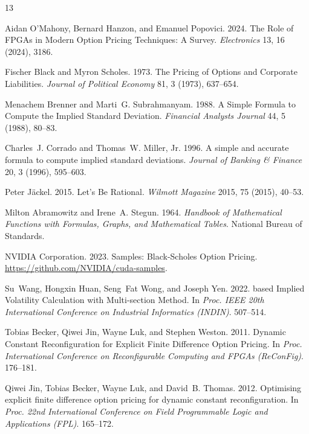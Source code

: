 \documentclass[sigconf,anonymous,review]{acmart}
\begin{document}
\begin{thebibliography}{13}

Aidan O'Mahony, Bernard Hanzon, and Emanuel Popovici. 2024.
\newblock The Role of {FPGAs} in Modern Option Pricing Techniques: A Survey.
\newblock \emph{Electronics} 13, 16 (2024), 3186.

Fischer Black and Myron Scholes. 1973.
\newblock The Pricing of Options and Corporate Liabilities.
\newblock \emph{Journal of Political Economy} 81, 3 (1973), 637--654.

Menachem Brenner and Marti~G. Subrahmanyam. 1988.
\newblock A Simple Formula to Compute the Implied Standard Deviation.
\newblock \emph{Financial Analysts Journal} 44, 5 (1988), 80--83.

Charles~J. Corrado and Thomas~W. Miller, Jr. 1996.
\newblock A simple and accurate formula to compute implied standard deviations.
\newblock \emph{Journal of Banking \& Finance} 20, 3 (1996), 595--603.

Peter J{\"a}ckel. 2015.
\newblock Let's Be Rational.
\newblock \emph{Wilmott Magazine} 2015, 75 (2015), 40--53.

Milton Abramowitz and Irene~A. Stegun. 1964.
\newblock \emph{Handbook of Mathematical Functions with Formulas, Graphs, and Mathematical Tables}.
\newblock National Bureau of Standards.

{NVIDIA Corporation}. 2023.
 Samples: {Black-Scholes} Option Pricing.
\newblock \url{https://github.com/NVIDIA/cuda-samples}.

Su~Wang, Hongxin Huan, Seng~Fat Wong, and Joseph Yen. 2022.
 based Implied Volatility Calculation with Multi-section Method.
\newblock In \emph{Proc. IEEE 20th International Conference on Industrial Informatics (INDIN)}. 507--514.

Tobias Becker, Qiwei Jin, Wayne Luk, and Stephen Weston. 2011.
\newblock Dynamic Constant Reconfiguration for Explicit Finite Difference Option Pricing.
\newblock In \emph{Proc. International Conference on Reconfigurable Computing and FPGAs (ReConFig)}. 176--181.

Qiwei Jin, Tobias Becker, Wayne Luk, and David~B. Thomas. 2012.
\newblock Optimising explicit finite difference option pricing for dynamic constant reconfiguration.
\newblock In \emph{Proc. 22nd International Conference on Field Programmable Logic and Applications (FPL)}. 165--172.


\end{thebibliography}
\end{document}
